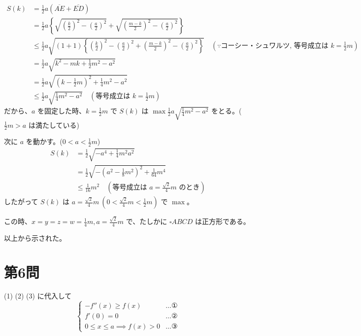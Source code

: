 \documentclass[../main.tex]{subfiles}
\begin{document}
\begin{align*}
  S(k) &= \frac{1}{2} a (\overline{AE} + \overline{ED}) \\
  &= \frac{1}{2} a \left\{ \sqrt{\left(\frac{k}{2}\right)^2 - \left(\frac{a}{2}\right)^2} + \sqrt{\left(\frac{m-k}{2}\right)^2 - \left(\frac{a}{2}\right)^2} \right\} \\
  &\le \frac{1}{2} a \sqrt{(1+1) \left\{ \left(\frac{k}{2}\right)^2 - \left(\frac{a}{2}\right)^2 + \left(\frac{m-k}{2}\right)^2 - \left(\frac{a}{2}\right)^2 \right\}} \quad (\because \text{コーシー・シュワルツ, 等号成立は } k = \frac{1}{2}m) \\
  &= \frac{1}{2} a \sqrt{k^2 - mk + \frac{1}{2}m^2 - a^2} \\
  &= \frac{1}{2} a \sqrt{\left(k - \frac{1}{2}m\right)^2 + \frac{1}{4}m^2 - a^2} \\
  &\le \frac{1}{2} a \sqrt{\frac{1}{4}m^2 - a^2} \quad (\text{等号成立は } k = \frac{1}{2}m)
\end{align*}
だから、$a$ を固定した時、$k = \frac{1}{2}m$ で $S(k)$ は $\max \frac{1}{2} a \sqrt{\frac{1}{4}m^2 - a^2}$ をとる。($\frac{1}{2}m > a$ は満たしている)

\noindent
次に $a$ を動かす。($0 < a < \frac{1}{2}m$)
\begin{align*}
  S(k) &= \frac{1}{2} \sqrt{ -a^4 + \frac{1}{4}m^2 a^2 } \\
  &= \frac{1}{2} \sqrt{ -\left(a^2 - \frac{1}{8}m^2\right)^2 + \frac{1}{64}m^4 } \\
  &\le \frac{1}{16} m^2 \quad (\text{等号成立は } a = \frac{\sqrt{2}}{4}m \text{ のとき})
\end{align*}
したがって $S(k)$ は $a = \frac{\sqrt{2}}{4}m \ (0 < \frac{\sqrt{2}}{4}m < \frac{1}{2}m)$ で $\max$。

\noindent
この時、$x = y = z = w = \frac{1}{4}m, a = \frac{\sqrt{2}}{4}m$ で、たしかに $\square ABCD$ は正方形である。

\noindent
以上から示された。

\newpage

\section*{第6問}

\noindent
[\textbf{解}] (1) (2) (3) に代入して
\begin{equation}
  \begin{cases}
    -f''(x) \ge f(x) & \dots \text{①} \\
    f'(0) = 0 & \dots \text{②} \\
    0 \le x \le a \implies f(x) > 0 & \dots \text{③}
  \end{cases}
\end{equation}
\end{document}
